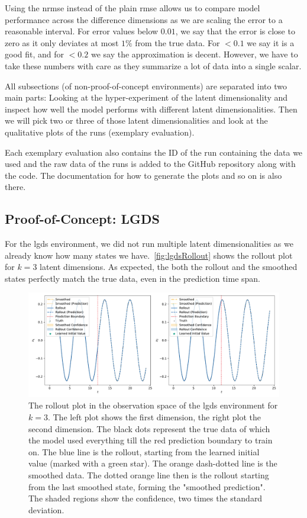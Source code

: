 	Using the \ac{nrmse} instead of the plain \ac{rmse} allows us to compare model performance across the difference dimensions as we are scaling the error to a reasonable interval. For error values below \( 0.01 \), we say that the error is close to zero as it only deviates at most \(1\%\) from the true data. For \(<0.1\) we say it is a good fit, and for \(<0.2\) we say the approximation is decent. However, we have to take these numbers with care as they summarize a lot of data into a single scalar.

	All subsections (of non-proof-of-concept environments) are separated into two main parts: Looking at the hyper-experiment of the latent dimensionality and inspect how well the model performs with different latent dimensionalities. Then we will pick two or three of those latent dimensionalities and look at the qualitative plots of the runs (exemplary evaluation).

	Each exemplary evaluation also contains the ID of the run containing the data we used and the raw data of the runs is added to the GitHub repository along with the code. The documentation for how to generate the plots and so on is also there.

	\subsection{Proof-of-Concept: LGDS}
		For the \ac{lgds} environment, we did not run multiple latent dimensionalities as we already know how many states we have.~\autoref{fig:lgdsRollout} shows the rollout plot for \( k = 3 \) latent dimensions. As expected, the both the rollout and the smoothed states perfectly match the true data, even in the prediction time span.

		\begin{figure}
			\centering
			\includegraphics[width=\linewidth]{figures/results/lgds/rollout-observations-N0.pdf}
			\caption{The rollout plot in the observation space of the \ac{lgds} environment for \(k = 3\). The left plot shows the first dimension, the right plot the second dimension. The black dots represent the true data of which the model used everything till the red prediction boundary to train on. The blue line is the rollout, starting from the learned initial value (marked with a green star). The orange dash-dotted line is the smoothed data. The dotted orange line then is the rollout starting from the last smoothed state, forming the "smoothed prediction". The shaded regions show the confidence, \ie two times the standard deviation.}
			\label{fig:lgdsRollout}
		\end{figure}

